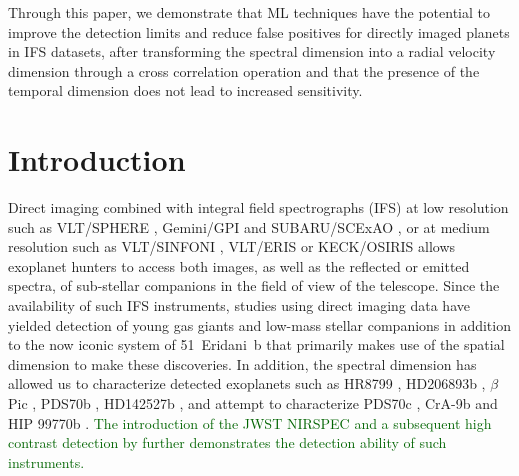 \documentclass{aa}
\newcommand{\newchange}[1]{\textcolor{darkgreen}{#1}}
\begin{document}
  {Through this paper, we demonstrate that ML techniques have the potential to improve the detection limits and reduce false positives for directly imaged planets in IFS datasets, after transforming the spectral dimension into a radial velocity dimension through a cross correlation operation and that the presence of the temporal dimension does not lead to increased sensitivity.
  }
   

\maketitle
%

\section{Introduction}

Direct imaging combined with integral field spectrographs (IFS) at low resolution such as VLT/SPHERE \citep{2019Beuzit}, Gemini/GPI \citep{2014MacintoshGPI} and SUBARU/SCExAO \citep{2015SCeXAO}, or at medium resolution such as VLT/SINFONI \citep{2004SINFONI}, VLT/ERIS \citep{2023Davies} or KECK/OSIRIS \citep{2000OSIRIS} allows exoplanet hunters to access both images, as well as the reflected or emitted spectra, of sub-stellar companions in the field of view of the telescope.
Since the availability of such IFS instruments, studies using direct imaging data have yielded detection of young gas giants \citep[e.g., PDS70b, ][]{2018KepplerPDS70} and low-mass stellar companions \citep[e.g., HD142527B, ][]{2019ClaudiHD142527b} in addition to the now iconic system of 51~Eridani~b \citep{2015MacintoshEridani} that primarily makes use of the spatial dimension to make these discoveries.
In addition, the spectral dimension has allowed us to characterize detected exoplanets such as HR8799 \citep[e.g][]{2008Marois, 2013Konopacky}, HD206893b \citep[][]{2017DelormeHD206893b}, $\beta$ Pic \citep[][]{2017ChilcoteBetapic}, PDS70b \citep[e.g][]{2018MullerPDS70,2019ChristiaensPDS70}, HD142527b \citep[][]{2018A&ChristiaensHD142527}, and attempt to characterize PDS70c \citep[][]{2019MesaPDS70}, CrA-9b \citep[][]{2021ChristiaensCrA-9b} and HIP 99770b \citep[][]{2023Currie}.
\newchange{The introduction of the JWST NIRSPEC \citet{2022BokerJWST} and a subsequent high contrast detection by \citet{2023RuffioJWST} further demonstrates the detection ability of such instruments.}
\end{document}
